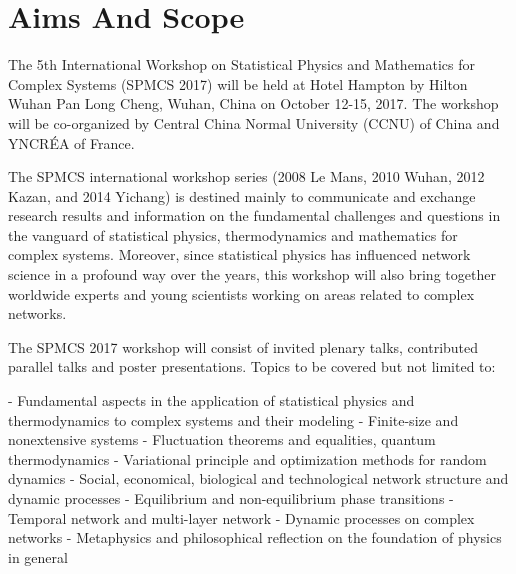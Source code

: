 \documentclass[oneside,A4paper,12pt]{article}
\begin{document}
\section*{Aims And Scope}
\label{sec:orge6d15c2}
\begin{flushleft}
The 5th International Workshop on Statistical Physics and Mathematics for Complex Systems (SPMCS 2017) will be held at Hotel Hampton by Hilton Wuhan Pan Long Cheng, Wuhan, China on October 12-15, 2017. The workshop will be co-organized by Central China Normal University (CCNU) of China and YNCRÉA of France.

The SPMCS international workshop series (2008 Le Mans, 2010 Wuhan, 2012 Kazan, and 2014 Yichang) is destined mainly to communicate and exchange research results and information on the fundamental challenges and questions in the vanguard of statistical physics, thermodynamics and mathematics for complex systems. Moreover, since statistical physics has influenced network science in a profound way over the years, this workshop will also bring together worldwide experts and young scientists working on areas related to complex networks.

The SPMCS 2017 workshop will consist of invited plenary talks, contributed parallel talks and poster presentations. Topics to be covered but not limited to:

\linebreak

- Fundamental aspects in the application of statistical physics and thermodynamics to complex systems and their modeling         \newline
- Finite-size and nonextensive systems                                                                                           \newline
- Fluctuation theorems and equalities, quantum thermodynamics                                                                    \newline
- Variational principle and optimization methods for random dynamics                                                             \newline
- Social, economical, biological and technological network structure and dynamic processes                                       \newline
- Equilibrium and non-equilibrium phase transitions                                                                              \newline
- Temporal network and multi-layer network                                                                                       \newline
- Dynamic processes on complex networks                                                                                          \newline
- Metaphysics and philosophical reflection on the foundation of physics in general 

\end{flushleft}
\end{document}
